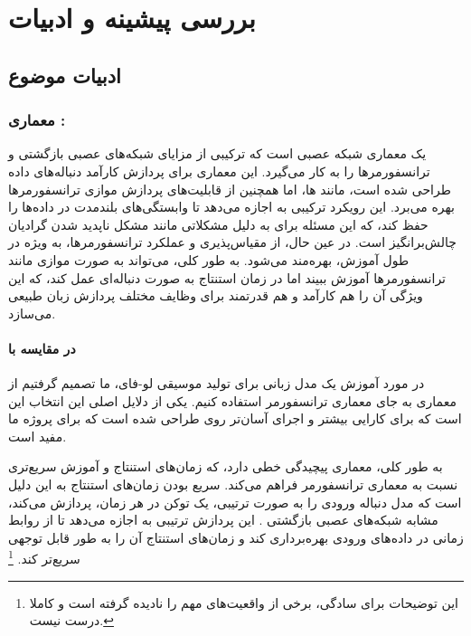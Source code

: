 
\chapter{بررسی پیشینه و ادبیات}
\section{ادبیات موضوع}
\subsection{ معماری :}

 \cite{RWKV} \cite{peng2024eagle} یک معماری شبکه عصبی است که ترکیبی از مزایای شبکه‌های عصبی بازگشتی  \cite{1808.03314} و ترانسفورمرها  \cite{1706.03762} را به کار می‌گیرد. این معماری برای پردازش کارآمد دنباله‌های داده طراحی شده است، مانند  ها، اما همچنین از قابلیت‌های پردازش موازی ترانسفورمرها بهره می‌برد. این رویکرد ترکیبی به  اجازه می‌دهد تا وابستگی‌های بلندمدت در داده‌ها را حفظ کند، که این مسئله برای  به دلیل مشکلاتی مانند مشکل ناپدید شدن گرادیان چالش‌برانگیز است. در عین حال، از مقیاس‌پذیری و عملکرد ترانسفورمرها، به ویژه در طول آموزش، بهره‌مند می‌شود. به طور کلی،  می‌تواند به صورت موازی مانند ترانسفورمرها آموزش ببیند اما در زمان استنتاج  به صورت دنباله‌ای عمل کند، که این ویژگی آن را هم کارآمد و هم قدرتمند برای وظایف مختلف پردازش زبان طبیعی می‌سازد.

\subsubsection{ در مقایسه با }
در مورد آموزش یک مدل زبانی برای تولید موسیقی لو-فای، ما تصمیم گرفتیم از معماری  به جای معماری ترانسفورمر استفاده کنیم. یکی از دلایل اصلی این انتخاب این است که  برای کارایی بیشتر و اجرای آسان‌تر روی  طراحی شده است که برای پروژه ما مفید است.

به طور کلی، معماری  پیچیدگی خطی دارد، که زمان‌های استنتاج و آموزش سریع‌تری نسبت به معماری ترانسفورمر فراهم می‌کند. سریع بودن زمان‌های استنتاج به این دلیل است که مدل  دنباله ورودی را به صورت ترتیبی، یک توکن در هر زمان، پردازش می‌کند، مشابه شبکه‌های عصبی بازگشتی . این پردازش ترتیبی به  اجازه می‌دهد تا از روابط زمانی در داده‌های ورودی بهره‌برداری کند و زمان‌های استنتاج آن را به طور قابل توجهی سریع‌تر کند. \footnote{این توضیحات برای سادگی، برخی از واقعیت‌های مهم را نادیده گرفته است و کاملا درست نیست.}

